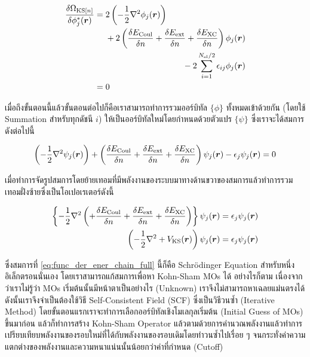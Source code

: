 \begin{align*}
    \fdv{\Omega_{\text{KS}[n]}}{\phi^{\ast}_{j}(\bm{r})} 
    &= \begin{multlined}[t]
        2 \left ( -\frac{1}{2}\nabla^{2} \phi_{j}(\bm{r}) \right ) \\
        + 2 \left ( \fdv{E_{\text{Coul}}}{n} + \fdv{E_{\text{ext}}}{n} + \fdv{E_{\text{XC}}}{n} \right ) 
        \phi_{j}(\bm{r}) \\
        - 2 \sum^{N_{\text{el}}/2}_{i=1} \epsilon_{ij} \phi_{j}(\bm{r})
        \end{multlined} \\
    &= 0
\end{align*}

เมื่อถึงขั้นตอนนี้แล้วขั้นตอนต่อไปก็คือเราสามารถทำการรวมออร์บิทัล $\{\phi\}$ ทั้งหมดเข้าด้วยกัน (โดยใช้ Summation สำหรับทุกดัชนี $i$) 
ให้เป็นออร์บิทัลใหม่โดยกำหนดด้วยตัวแปร $\{\psi\}$ ซึ่งเราจะได้สมการดังต่อไปนี้

\begin{equation}
    \left ( -\frac{1}{2}\nabla^{2} \psi_{j}(\bm{r}) \right )
    + \left ( \fdv{E_{\text{Coul}}}{n} + \fdv{E_{\text{ext}}}{n} + \fdv{E_{\text{XC}}}{n} \right ) 
    \psi_{j}(\bm{r}) - \epsilon_{j} \psi_{j}(\bm{r})
    = 0
\end{equation}

\noindent เมื่อทำการจัดรูปสมการโดยย้ายเทอมที่มีพลังงานของระบบมาทางด้านขวาของสมการแล้วทำการรวมเทอมฝั่งซ้ายซึ่งเป็นโอเปอเรเตอร์ดังนี้

\begin{align}    
    \left \{ -\frac{1}{2}\nabla^{2} \left (
    + \fdv{E_{\text{Coul}}}{n} + \fdv{E_{\text{ext}}}{n} + \fdv{E_{\text{XC}}}{n} \right ) 
    \right \} \psi_{j}(\bm{r})
    = \epsilon_{j} \psi_{j}(\bm{r}) \nonumber \\
    \left ( -\frac{1}{2}\nabla^{2} + V_{\text{KS}}(\bm{r}) \right ) \psi_{j}(\bm{r})
    = \epsilon_{j} \psi_{j}(\bm{r}) \label{eq:func_der_ener_chain_full}
\end{align}

\noindent ซึ่งสมการที่ \ref{eq:func_der_ener_chain_full} นี้ก็คือ Schr\"{o}dinger Equation สำหรับหนึ่งอิเล็กตรอนนั่นเอง 
โดยเราสามารถแก้สมการเพื่อหา Kohn-Sham MOs ได้ อย่างไรก็ตาม เนื่องจากว่าเราไม่รู้ว่า MOs เริ่มต้นนั้นมีหน้าตาเป็นอย่างไร (Unknown)
เราจึงไม่สามารถหาเฉลยแม่นตรงได้ ดังนั้นเราจึงจำเป็นต้องใช้วิธี Self-Consistent Field (SCF) ซึ่งเป็นวิธีวนซ้ำ (Iterative Method) 
โดยขั้นตอนแรกเราจะทำการเลือกออร์บิทัลเชิงโมเลกุลเริ่มต้น (Initial Guess of MOs) ขึ้นมาก่อน แล้วก็ทำการสร้าง Kohn-Sham Operator 
แล้วตามด้วยการคำนวณพลังงานแล้วทำการเปรียบเทียบพลังงานของรอบใหม่ที่ได้กับพลังงานของรอบเดิมโดยทำวนซ้ำไปเรื่อย ๆ จนกระทั่งค่าความ%
แตกต่างของพลังงานและความหนาแน่นนั้นน้อยกว่าค่าที่กำหนด (Cutoff)

